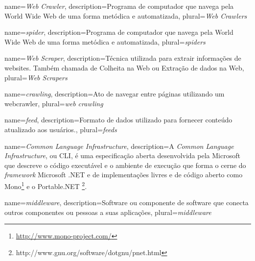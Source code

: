 

				{name={\emph{Web Crawler}},
				 description={Programa de computador que navega pela World Wide Web de uma forma metódica e automatizada},
				 plural={\emph{Web Crawlers}}
				}

				{name={\emph{spider}},
				 description={Programa de computador que navega pela World Wide Web de uma forma metódica e automatizada},
				 plural={\emph{spiders}}
				}
				 
				{name={\emph{Web Scraper}},
				 description={Técnica utilizada para extrair informações de websites. Também chamada de Colheita na Web ou Extração de dados na Web},
				 plural={\emph{Web Scrapers}}
				 }
				 
				{name={\emph{crawling}},
				 description={Ato de navegar entre páginas utilizando um \gls{webcrawler}},
				 plural={\emph{web crawling}}
				}

				{name={\emph{feed}},
				 description={Formato de dados utilizado para fornecer conteúdo atualizado aos usuários.},
				 plural={\emph{feeds}}
				}

				{name={\emph{Common Language Infrastructure}},
				 description={A \emph{Common Language Infrastructure}, ou CLI, é uma especificação aberta desenvolvida pela Microsoft que descreve o código executável e o ambiente de execução que forma o cerne do \emph{framework} Microsoft .NET e de implementações livres e de código aberto como Mono\footnote{\url{http://www.mono-project.com/}} e o Portable.NET \footnote{http://www.gnu.org/software/dotgnu/pnet.html}}.
				}

				{name={\emph{middleware}},
				 description={Software ou componente de software que conecta outros componentes ou pessoas a suas aplicações},
				 plural={\emph{middleware}}
				}
				
